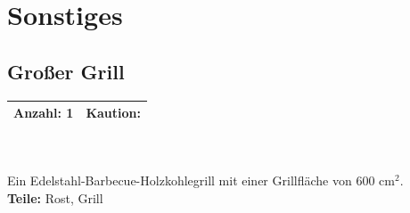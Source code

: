 \documentclass[a4paper]{article}
\newcommand{\infobox}[3] %
        {\par
        		{\tabulinesep=1.2mm
                \begin{tabu}{| c | c |}
                \hline
                Anzahl: #1 & Kaution: \EUR{#3}   \\
                \hline
                \end{tabu}} \\ \\
        }
\begin{document}
\section{Sonstiges}

\subsection{Großer Grill}
\infobox{1}{5}{0}
Ein Edelstahl-Barbecue-Holzkohlegrill mit einer Grillfläche von 600 cm$^2$. \\
\textbf{Teile:} Rost, Grill

\end{document}

